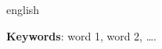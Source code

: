 \begin{resumo}[Abstract]
 \begin{otherlanguage*}{english}
  
  \lipsum[1] 

   \vspace{\onelineskip}
 
   \noindent 
   \textbf{Keywords}:  word 1, word 2, \ldots.
 \end{otherlanguage*}
\end{resumo}